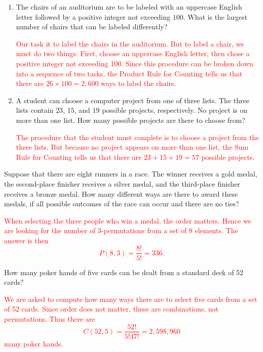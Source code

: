 \documentclass[12pt,reqno]{amsart}
\begin{document}
\bigskip
\prob

\begin{enumerate}
\item The chairs of an auditorium are to be labeled with an uppercase English letter followed by a positive integer not exceeding $100$. What is the largest number of chairs that can be labeled differently?

\bigskip
\textcolor{red}{Our task it to label the chairs in the auditorium. But to label a chair, we must do two things: First, choose an uppercase English letter, then chose a positive integer not exceeding 100. Since this procedure can be broken down into a sequence of two tasks, the Product Rule for Counting tells us that there are $26 \times 100 = 2{,}600$ ways to label the chairs.}
\bigskip

\item A student can choose a computer project from one of three lists. The three lists contain $23$, $15$, and $19$ possible projects, respectively. No project is on more than one list. How many possible projects are there to choose from?

\bigskip
\textcolor{red}{The procedure that the student must complete is to choose a project from the three lists. But because no project appears on more than one list, the Sum Rule for Counting tells us that there are $23+15+19 = 57$ possible projects.}
\end{enumerate}









\bigskip
\prob Suppose that there are eight runners in a race. The winner receives a gold medal, the second-place finisher receives a silver medal, and the third-place finisher receives a bronze medal. How many different ways are there to award these medals, if all possible outcomes of the race can occur and there are no ties?

\bigskip
\textcolor{red}{When selecting the three people who win a medal, the order matters. Hence we are looking for the number of $3$-permutations from a set of $8$ elements. The answer is then
	\[
	P(8,3) = \frac{8!}{5!} = 336.
	\]}
\bigskip







\prob How many poker hands of five cards can be dealt from a standard deck of 52 cards?

\bigskip
\textcolor{red}{We are asked to compute how many ways there are to select five cards from a set of 52 cards. Since order does not matter, these are combinations, not permutations. Thus there are
	\[
	C(52,5) = \frac{52!}{5!47!} = 2,598,960
	\]
many poker hands.}
\bigskip
\end{document}
